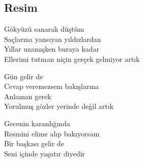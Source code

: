 \subsection{Resim}

Gökyüzü sanarak düştüm \\
Saçlarına yansıyan yıldızlardan \\
Yıllar uzamışken buraya kadar \\
Ellerimi tutman niçin gerçek gelmiyor artık

\noindent\newline
Gün gelir de \\
Cevap veremezsem bakışlarına \\
Anlaman gerek \\
Yorulmuş gözler yerinde değil artık

\noindent\newline
Gecenin karanlığında \\
Resmini elime alıp bakıyorsam \\
Bir başkası gelir de \\
Seni içinde yaşatır diyedir